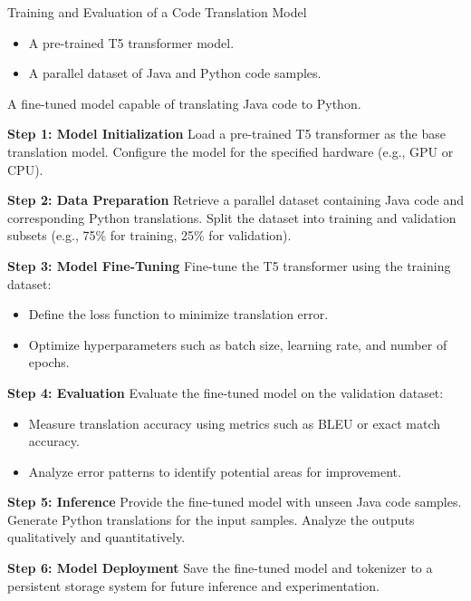 \documentclass{dhbenelux}
\begin{document}
\begin{algorithm}
\caption{Training and Evaluation of a Code Translation Model}
\label{alg:code_translation}
\begin{algorithmic}[1]
\Require 
\begin{itemize}
    \item A pre-trained T5 transformer model.
    \item A parallel dataset of Java and Python code samples.
\end{itemize}
\Ensure A fine-tuned model capable of translating Java code to Python.

\State \textbf{Step 1: Model Initialization}
\State Load a pre-trained T5 transformer as the base translation model.
\State Configure the model for the specified hardware (e.g., GPU or CPU).

\State \textbf{Step 2: Data Preparation}
\State Retrieve a parallel dataset containing Java code and corresponding Python translations.
\State Split the dataset into training and validation subsets (e.g., 75\% for training, 25\% for validation).

\State \textbf{Step 3: Model Fine-Tuning}
\State Fine-tune the T5 transformer using the training dataset:
\begin{itemize}
    \item Define the loss function to minimize translation error.
    \item Optimize hyperparameters such as batch size, learning rate, and number of epochs.
\end{itemize}

\State \textbf{Step 4: Evaluation}
\State Evaluate the fine-tuned model on the validation dataset:
\begin{itemize}
    \item Measure translation accuracy using metrics such as BLEU or exact match accuracy.
    \item Analyze error patterns to identify potential areas for improvement.
\end{itemize}

\State \textbf{Step 5: Inference}
\State Provide the fine-tuned model with unseen Java code samples.
\State Generate Python translations for the input samples.
\State Analyze the outputs qualitatively and quantitatively.

\State \textbf{Step 6: Model Deployment}
\State Save the fine-tuned model and tokenizer to a persistent storage system for future inference and experimentation.

\end{algorithmic}
\end{algorithm}
\end{document}
